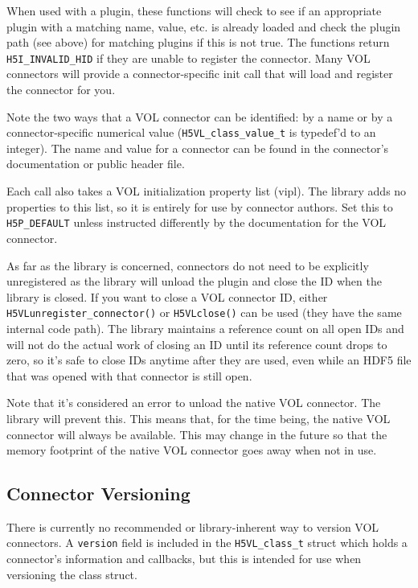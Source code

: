 When used with a plugin, these functions will check to see if an appropriate plugin with a matching name, value, etc. is already loaded and check the plugin path (see above) for matching plugins if this is not true. The functions return {\tt H5I\_INVALID\_HID} if they are unable to register the connector. Many VOL connectors will provide a connector-specific init call that will load and register the connector for you.

Note the two ways that a VOL connector can be identified: by a name or by a connector-specific numerical value ({\tt H5VL\_class\_value\_t} is typedef'd to an integer). The name and value for a connector can be found in the connector's documentation or public header file.

Each call also takes a VOL initialization property list (vipl). The library adds no properties to this list, so it is entirely for use by connector authors. Set this to {\tt H5P\_DEFAULT} unless instructed differently by the documentation for the VOL connector.

As far as the library is concerned, connectors do not need to be explicitly unregistered as the library will unload the plugin and close the ID when the library is closed. If you want to close a VOL connector ID, either {\tt H5VLunregister\_connector()} or {\tt H5VLclose()} can be used (they have the same internal code path). The library maintains a reference count on all open IDs and will not do the actual work of closing an ID until its reference count drops to zero, so it's safe to close IDs anytime after they are used, even while an HDF5 file that was opened with that connector is still open.

Note that it's considered an error to unload the native VOL connector. The library will prevent this. This means that, for the time being, the native VOL connector will always be available. This may change in the future so that the memory footprint of the native VOL connector goes away when not in use.

\subsection{Connector Versioning}


There is currently no recommended or library-inherent way to version VOL connectors. A {\tt version} field is included in the {\tt H5VL\_class\_t} struct which holds a connector's information and callbacks, but this is intended for use when versioning the class struct.

